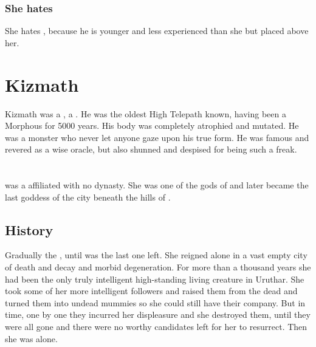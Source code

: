 \subsubsection{She hates \Teshrial}
She hates \Teshrial, because he is younger and less experienced than she but placed above her.















\section{Kizmath}
Kizmath was a  \resphan, a . 
He was the oldest High Telepath known, having been a Morphous for 5000 years. 
His body was completely atrophied and mutated. 
He was a monster who never let anyone gaze upon his true form.
He was famous and revered as a wise oracle, but also shunned and despised for being such a freak. 















\section{\Lethiarch}
\index{\Lethiarch}
\Lethiarch was a \bezed \resvil affiliated with no dynasty. 
She was one of the gods of  and later became the last goddess of the city beneath the hills of . 









\subsection{History}
Gradually the , until \Lethiarch was the last one left.
She reigned alone in a vast empty city of death and decay and morbid degeneration.
For more than a thousand years she had been the only truly intelligent high-standing living creature in Uruthar. 
She took some of her more intelligent followers and raised them from the dead and turned them into undead mummies so she could still have their company.
But in time, one by one they incurred her displeasure and she destroyed them, until they were all gone and there were no worthy candidates left for her to resurrect.
Then she was alone. 

